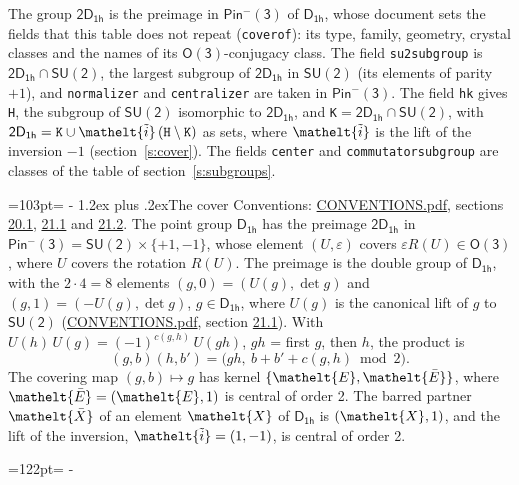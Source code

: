 \documentclass[10pt,a4paper]{article}
\makeatletter
\renewcommand\section{\@startsection{section}{1}{\z@}{-3ex plus -1ex minus -.2ex}%
  {1.2ex plus .2ex}{\normalfont\large\sffamily\bfseries\color{parttitle}}}
\newcommand{\needspace}[1]{\par\penalty-100\begingroup\dimen0=#1\relax\dimen2=\pagegoal
  \advance\dimen2-\pagetotal\ifdim\dimen0>\dimen2\relax\ifdim\dimen2>0pt\vfil\break\fi\fi
  \endgroup}
\numberwithin{equation}{section}
\newcommand{\eltfont}[1]{{\let\sigma\eltsigma\mathelt{#1}}}
\newcommand{\grp}[1]{\mathsf{#1}}
\newcommand{\elt}[1]{\eltfont{#1}}
\newcommand{\dirprod}{\times}
\newcommand{\barred}[1]{\bar{#1}}
\newcommand{\lift}[1]{\tilde{#1}}
\makeatother
\begin{document}
\leavevmode\label{n:element.inversion}\label{n:group.preimage}The group $\grp{2D_{1h}}$ is the preimage in $\grp{Pin^{-}(3)}$ of \href{../../../rotation/data/pdf/D1h.pdf}{$\grp{D_{1h}}$}, whose document sets the fields that this table does not repeat (\texttt{coverof}): its type, family, geometry, crystal classes and the names of its \href{../../../rotation/data/pdf/O3.pdf}{$\grp{O(3)}$}-conjugacy class. The field \texttt{su2subgroup} is $\grp{2D_{1h}} \cap \grp{SU(2)}$, the largest subgroup of $\grp{2D_{1h}}$ in $\grp{SU(2)}$ (its elements of parity $+1$), and \texttt{normalizer} and \texttt{centralizer} are taken in $\grp{Pin^{-}(3)}$. The field \texttt{hk} gives \texttt{H}, the subgroup of $\grp{SU(2)}$ isomorphic to $\grp{2D_{1h}}$, and \texttt{K}${} = \grp{2D_{1h}} \cap \grp{SU(2)}$, with $\grp{2D_{1h}} = \texttt{K} \cup \elt{\lift{i}}\,(\texttt{H} \setminus \texttt{K})$ as sets, where $\elt{\lift{i}}$ is the lift of the inversion $-1$ (section~\ref{s:cover}). The fields \texttt{center} and \texttt{commutatorsubgroup} are classes of the table of section~\ref{s:subgroups}.
\needspace{103pt}
\section{The cover}\label{s:cover}
Conventions: \href{../../CONVENTIONS.pdf}{CONVENTIONS.pdf}, sections \href{../../CONVENTIONS.pdf\#conv.20.1}{20.1}, \href{../../CONVENTIONS.pdf\#conv.21.1}{21.1} and \href{../../CONVENTIONS.pdf\#conv.21.2}{21.2}.
\leavevmode\label{n:group.pin.minus}\label{n:group.su2}\label{n:local.pin.sign}\label{n:matrix.covered}\label{n:matrix.lift.su2}\label{n:index.bar}The point group $\grp{D_{1h}}$ has the preimage $\grp{2D_{1h}}$ in $\grp{Pin^{-}(3)} = \grp{SU(2)} \dirprod \{+1, -1\}$, whose element $(U, \varepsilon)$ covers $\varepsilon R(U) \in \grp{O(3)}$, where $U$ covers the rotation $R(U)$. The preimage is the double group of $\grp{D_{1h}}$, with the $2 \cdot 4 = 8$ elements $(g, 0) = (U(g), \det g)$ and $(g, 1) = (-U(g), \det g)$, $g \in \grp{D_{1h}}$, where $U(g)$ is the canonical lift of $g$ to $\grp{SU(2)}$ (\href{../../CONVENTIONS.pdf}{CONVENTIONS.pdf}, section \href{../../CONVENTIONS.pdf\#conv.21.1}{21.1}). \label{n:function.cocycle}With $U(h)\,U(g) = (-1)^{c(g,h)}\,U(gh)$, $gh$ = first $g$, then $h$, the product is
\begin{equation}\label{e:product}(g, b)(h, b') = \bigl(gh,\ b + b' + c(g, h) \bmod 2\bigr).\end{equation}
\leavevmode\label{n:mark.bar}The covering map $(g, b) \mapsto g$ has kernel $\{\elt{E}, \elt{\barred{E}}\}$, where $\elt{\barred{E}} = (\elt{E}, 1)$ is central of order 2. \label{n:element.named}\label{n:mark.lift}The barred partner $\elt{\barred{X}}$ of an element $\elt{X}$ of $\grp{D_{1h}}$ is $(\elt{X}, 1)$, and the lift of the inversion, $\elt{\lift{i}} = (1, -1)$, is central of order 2.
\needspace{122pt}
\end{document}
